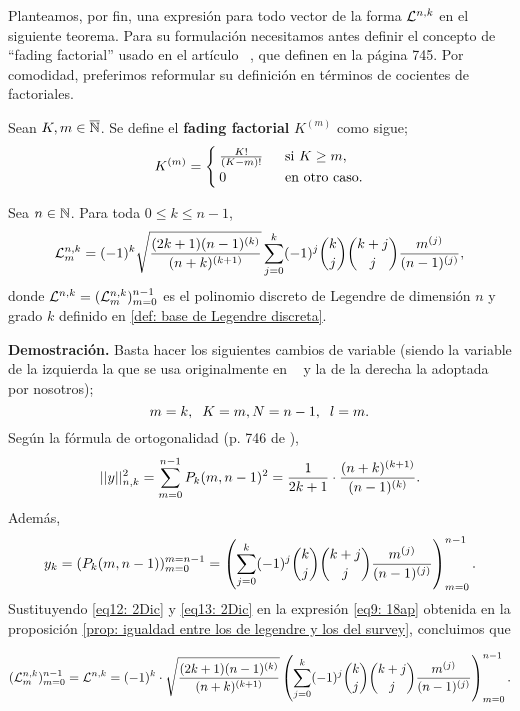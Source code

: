 Planteamos, por fin, una expresión para
todo vector de la forma
$\mathcal{L}^{n,k}$ en el siguiente teorema.
Para su formulación necesitamos antes
definir el concepto de ``fading factorial''
usado en el artículo ~\cite{Neuman}, que definen en 
la página 745. Por comodidad, preferimos reformular
su definición en términos de cocientes de factoriales.
\begin{defi}
\label{def: fading factorial}
Sean $K, m \in \overline{\mathbb{N}}$. Se define
el \textbf{fading factorial} $K^{(m)}$ como sigue;
\begin{align*}
K^{(m)}= \begin{cases}
\frac{K!}{(K-m)!} & \hspace{0.2cm} \text{si } K \geq m, \\
0 & \hspace{0.2cm} \text{en otro caso.} 
\end{cases}
\end{align*}
\end{defi}

\begin{teo}
\label{teo: expresión analítica de BON de Legendre}
Sea $n\in \mathbb{N}$. Para toda $0 \leq k \leq n-1$,
\begin{equation}
\label{eq0: 6En}
\mathcal{L}^{n,k}_{m}= (-1)^{k} \sqrt{\frac{(2k+1)(n-1)^{(k)}}{(n+k)^{(k+1)}}}
\sum\limits_{j=0}^{k}(-1)^{j}\binom{k}{j}\binom{k+j}{j}
\frac{m^{(j)}}{(n-1)^{(j)}},
\end{equation}
donde $\mathcal{L}^{n,k}=(\mathcal{L}_{m}^{n,k})_{m=0}^{n-1}$
es el polinomio discreto de Legendre de
dimensión $n$ y grado $k$ definido en 
\ref{def: base de Legendre discreta}.
\end{teo}  

\noindent
\textbf{Demostración.}
Basta hacer los siguientes cambios de variable
(siendo la variable de la izquierda la que se
usa originalmente en ~\cite{Neuman} y la de la 
derecha la adoptada por nosotros);
\[
m=k, \hspace{0.2cm} K=m,
N=n-1, \hspace{0.2cm} l=m.
\]
Según la fórmula de ortogonalidad
(p. 746 de \cite{Neuman}),
\begin{equation}
\label{eq12: 2Dic}
||y||_{n,k}^{2}= \sum\limits_{m=0}^{n-1}P_{k}(m, n-1)^{2}
= \frac{1}{2k+1} \cdot \frac{(n+k)^{(k+1)}}{(n-1)^{(k)}}.
\end{equation}
Además, 
\begin{equation}
\label{eq13: 2Dic}
y_{k}= (P_{k}(m, n-1))_{m=0}^{m=n-1}
= \left(
\sum\limits_{j=0}^{k}(-1)^{j}\binom{k}{j}\binom{k+j}{j}
\frac{m^{(j)}}{(n-1)^{(j)}}
\right)_{m=0}^{n-1}.
\end{equation}
Sustituyendo \eqref{eq12: 2Dic}
y \eqref{eq13: 2Dic} en la expresión
\eqref{eq9: 18ap} obtenida
en la proposición
\ref{prop: igualdad entre los de legendre y los del survey},
concluimos que

\[
(\mathcal{L}_{m}^{n,k})_{m=0}^{n-1}
= \mathcal{L}^{n,k}
= (-1)^{k} \cdot 
\sqrt{\frac{(2k+1)(n-1)^{(k)}}{(n+k)^{(k+1)}}}
\left(
\sum\limits_{j=0}^{k}(-1)^{j}\binom{k}{j}\binom{k+j}{j}
\frac{m^{(j)}}{(n-1)^{(j)}}
\right)_{m=0}^{n-1}.
\]


\QEDB 
\vspace{0.2cm}